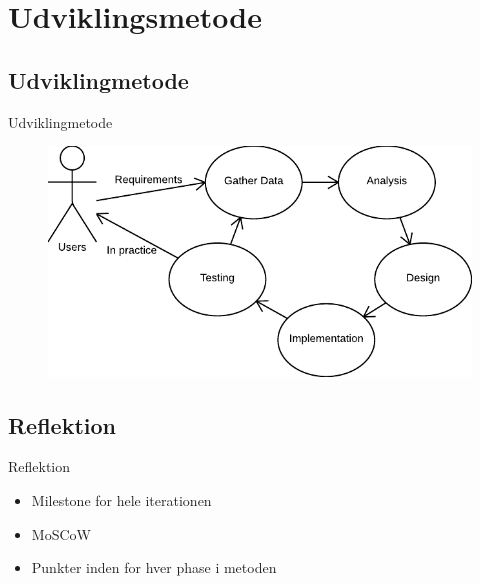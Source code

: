 \section{Udviklingsmetode}

\subsection{Udviklingmetode}
\begin{frame}{Udviklingmetode}
  \begin{figure}
    \centering
    \includegraphics{slides/Heider/Developmentprocess}
  \end{figure}
\end{frame}
\subsection{Reflektion}
\begin{frame}{Reflektion}
  \begin{itemize}
    \item Milestone for hele iterationen
    \item MoSCoW
    \item Punkter inden for hver phase i metoden
  \end{itemize}
\end{frame}